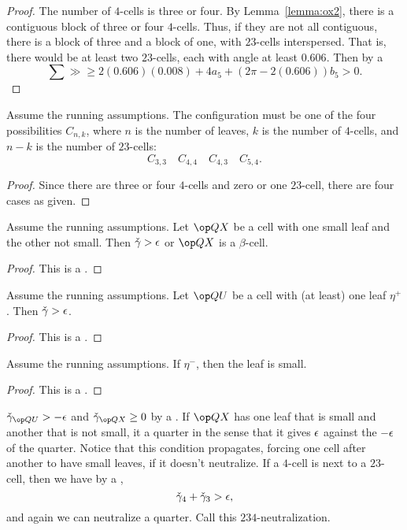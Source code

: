 \begin{proof}
The number of $4$-cells is three or four.
By Lemma~\ref{lemma:ox2}, there is a contiguous block of three or four $4$-cells.  Thus,
if they are not all contiguous, there is a block of three and a block of one,
with $23$-cells interspersed.  That is, there would be at least two $23$-cells,
each with angle at least $0.606$.  Then by a 
\[
\sum \gg \ge 2 (0.606) (0.008) + 4 a_5 + (2\pi-2 (0.606)) b_5 > 0.
\]
\end{proof}

\begin{lemma}\label{lemma:ox-cases}
Assume the running assumptions.  The configuration must be one of the four possibilities $C_{n,k}$, where $n$ is the number of leaves, $k$ is the number of $4$-cells, and $n-k$ is the number of $23$-cells:
\[
C_{3,3}\quad C_{4,4}\quad C_{4,3}\quad C_{5,4}.
\]
\end{lemma}

\begin{proof} Since there are three or four $4$-cells and zero or one $23$-cell,
there are four cases as given.
\end{proof}

\begin{lemma}
Assume the running assumptions.  Let $\QX$ be a cell with one small leaf and the other not small.
Then $\check\gamma > \epsilon$ or $\QX$ is a $\beta$-cell.  
\end{lemma}

\begin{proof} This is a .
\end{proof}

\begin{lemma}
Assume the running assumptions.  
Let $\QU$ be a cell with (at least) one leaf $\eta^+$.  Then $\check\gamma > \epsilon$.
\end{lemma}

\begin{proof} This is a .
\end{proof}

\begin{lemma}
Assume the running assumptions.  If $\eta^-$, then the leaf is small.
\end{lemma}

\begin{proof} This is a .
\end{proof}

\begin{remark}[neutralize]
 $\gg_{\QU} > -\eps$ and $\gg_{\QX}\ge 0$ by a .
If $\QX$ has one leaf that is small and another that is not small, 
it  a quarter in the
sense that it gives $\epsilon$ against the $-\epsilon$ of the quarter.
Notice that this condition propagates, forcing one cell after another to have
small leaves, if it doesn't neutralize.
If a $4$-cell is next to a $23$-cell, then we have by a ,
\[
\check\gamma_4 + \check\gamma_3 > \epsilon,
\]
and again we can neutralize a quarter.  Call this $234$-neutralization.
\end{remark}

